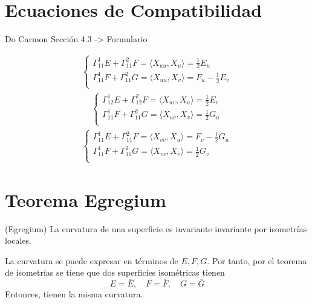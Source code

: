 \section{Ecuaciones de Compatibilidad}

Do Carmon Sección 4.3 -> Formulario

\begin{nota}
  \[ 
    \begin{aligned}
      \begin{cases}
        \Gamma_{11}^{1} E + \Gamma_{11}^{2} F = \langle X_{uu}{ , }X_{u} \rangle = \frac{1}{2} E_{u} \\
        \Gamma_{11}^{1} F + \Gamma_{11}^{2} G = \langle X_{uu}{ , }X_{v} \rangle = F_{u} - \frac{1}{2} E_{v} \\
      \end{cases}
    \end{aligned} 
  \] 
  \[ 
    \begin{aligned}
      \begin{cases}
        \Gamma_{12}^{1} E + \Gamma_{12}^{2} F = \langle X_{uv}{ , }X_{u} \rangle = \frac{1}{2} E_{v} \\
        \Gamma_{11}^{1} F + \Gamma_{11}^{2} G = \langle X_{uv}{ , }X_{v} \rangle = \frac{1}{2}G_{u} \\
      \end{cases}
    \end{aligned} 
  \] 
  \[ 
    \begin{aligned}
      \begin{cases}
        \Gamma_{11}^{1} E + \Gamma_{11}^{2} F = \langle X_{vv}{ , }X_{u} \rangle = F_{v} - \frac{1}{2} G_{u} \\
        \Gamma_{11}^{1} F + \Gamma_{11}^{2} G = \langle X_{vv}{ , }X_{v} \rangle = \frac{1}{2} G_{v} \\
      \end{cases}
    \end{aligned} 
  \] 
\end{nota}


\section{Teorema Egregium}

\begin{theo}(Egregium)
  La curvatura de una superficie es invariante invariante por isometrías locales.
\end{theo}

\begin{dem}
  La curvatura se puede expresar en términos de $E, F, G$. Por tanto, por el teorema de isometrías se tiene que dos superficies isométricas tienen
  \[
    E = \overline{E},  \quad F = \overline{F}, \quad G = \overline{G}
  \]
  Entonces, tienen la misma curvatura.
\end{dem}

